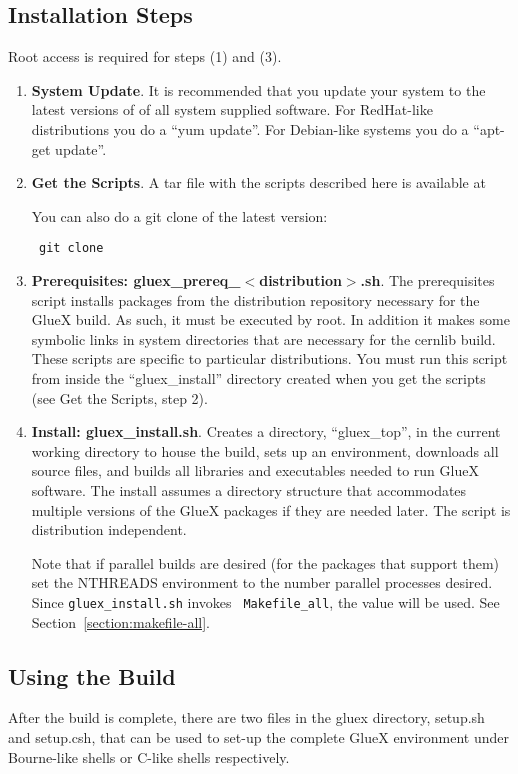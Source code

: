 \documentclass[12pt]{article}
\begin{document}
\subsection{Installation Steps}

Root access is required for steps (1) and (3).

\begin{enumerate}

\item {\bf System Update}. It is recommended that you update your
  system to the latest versions of of all system supplied
  software. For RedHat-like distributions you do a ``yum update''. For
  Debian-like systems you do a ``apt-get update''.

\item {\bf Get the Scripts}. A tar file with the scripts described
  here is available at
  \begin{center}
  \end{center}
You can also do a git clone of the latest version:
\begin{center}\tt
  git clone 
\end{center}

\item {\bf Prerequisites: gluex\_prereq\_$<$distribution$>$.sh}. The
  prerequisites script installs packages from the distribution
  repository necessary for the GlueX build. As such, it must be
  executed by root. In addition it makes some symbolic links in system
  directories that are necessary for the cernlib build. These scripts
  are specific to particular distributions. You must run this
  script from inside the ``gluex\_install'' directory created when you
  get the scripts (see Get the Scripts, step 2).

\item {\bf Install: gluex\_install.sh}. Creates a directory,
  ``gluex\_top'', in the current working directory to house the build,
  sets up an environment, downloads all source files, and builds all
  libraries and executables needed to run GlueX software. The install
  assumes a directory structure that accommodates multiple versions of
  the GlueX packages if they are needed later. The script is
  distribution independent.

  Note that if parallel builds are desired (for the packages that
  support them) set the NTHREADS environment to the number parallel
  processes desired. Since {\tt gluex\_install.sh} invokes {\tt
    Makefile\_all}, the value will be used. See
  Section\ \ref{section:makefile-all}.

\end{enumerate}

\subsection{Using the Build}

After the build is complete, there are two files in the gluex
directory, setup.sh and setup.csh, that can be used to set-up the
complete GlueX environment under Bourne-like shells or C-like shells
respectively.
\end{document}
